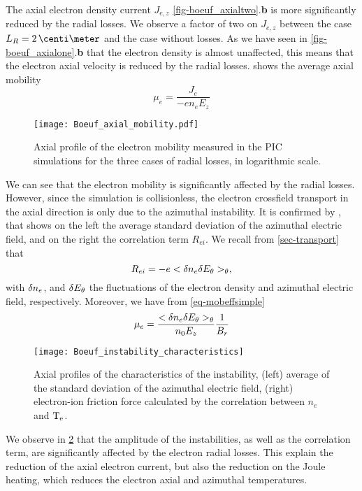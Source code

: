   The axial electron density current $J_{e, z}$ \cref{fig-boeuf_axialtwo}.{\bf b} is more significantly reduced by the radial losses.
  We observe a factor of two on $J_{e, z}$ between the case $L_R=2\,\centi\meter$ and the case without losses.
  As we have seen in \cref{fig-boeuf_axialone}.{\bf b} that the electron density is almost unaffected, this means that the electron axial velocity is reduced by the radial losses.
   shows the average axial mobility \[ \mu_e = \frac{J_e}{-e n_e E_z}  \]

  \begin{figure}[!hbt]
    \centering
    \texttt{[image: Boeuf\_axial\_mobility.pdf]}
    \caption{Axial profile of the electron mobility measured in the \ac{PIC} simulations for the three cases of radial losses, in logarithmic scale.}
    \label{fig-mobility}
  \end{figure}

  We can see that the electron mobility is significantly affected by the radial losses.
  However, since the simulation is collisionless, the electron crossfield transport in the axial direction is only due to the azimuthal instability.
  It is confirmed by , that shows on the left the average standard deviation of the azimuthal electric field, and on the right the correlation term $R_{ei}$.
  We recall from \cref{sec-transport} that 
  \begin{equation} \label{eq-rei}
    R_{ei} =  - e < \delta n_e \delta E_{\theta} >_{\theta},
  \end{equation}
  with $\delta n_e$, and $\delta E_{\theta}$ the fluctuations of the electron density and azimuthal electric field, respectively.
  Moreover, we have from \cref{eq-mobeffsimple}
  \begin{equation*}
    \mu_e = \frac{< \delta n_e \delta E_{\theta} >_{\theta} }{n_0 E_z}   \frac{1}{B_r}
  \end{equation*}


  \begin{figure}[!hbt]
    \centering
    \texttt{[image: Boeuf\_instability\_characteristics]}
    \caption{Axial profiles of the characteristics of the instability, (left) average of the standard deviation of the azimuthal electric field, (right) electron-ion friction force calculated by the correlation between $n_e$ and $\mathrm{T_e}$.    }
    \label{fig-boeuf-instability}
  \end{figure}

  
  We observe in \cref{fig-boeuf-instability} that the amplitude of the instabilities, as well as the correlation term, are significantly affected by the electron radial losses.
  This explain the reduction of the axial electron current, but also the reduction on the Joule heating, which reduces the electron axial and azimuthal temperatures.

